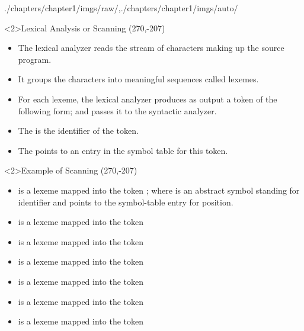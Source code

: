 \begin{graphicspathcontext}{{./chapters/chapter1/imgs/raw/},{./chapters/chapter1/imgs/auto/}}
\begin{bibunit}[apalike]
\begin{frame}<2>{Lexical Analysis or Scanning}
	\putat(270,-207){}
	\begin{minipage}{.8\linewidth}
	\begin{itemize}
	\item The lexical analyzer reads the stream of characters making up the source program.
	\item It groups the characters into meaningful sequences called lexemes.
	\item For each lexeme, the lexical analyzer produces as output a token of the following form; and passes it to the syntactic analyzer.
		\begin{center}
		\end{center}
	\item The  is the identifier of the token.
	\item The  points to an entry in the symbol table for this token.
	\end{itemize}
	\end{minipage}
\end{frame}

\begin{frame}<2>{Example of Scanning}
	\putat(270,-207){}
	\begin{small}
	\begin{center}
	\end{center}
	\begin{minipage}{.8\linewidth}
	\begin{itemize}
	\item {} is a lexeme mapped into the token ; where  is an abstract symbol standing for identifier and  points to the symbol-table entry for position.
	\item \code{=} is a lexeme mapped into the token \code{{\textless}={\textgreater}}
	\item {} is a lexeme mapped into the token 
	\item \code{+} is a lexeme mapped into the token \code{{\textless}+{\textgreater}}
	\item {} is a lexeme mapped into the token 
	\item \code{*} is a lexeme mapped into the token \code{{\textless}*{\textgreater}}
	\item {} is a lexeme mapped into the token 
	\end{itemize}
	\end{minipage}
	\end{small}
\end{frame}


\end{bibunit}
\end{graphicspathcontext}
